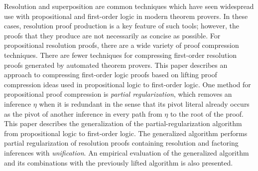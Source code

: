 Resolution and superposition are common techniques which have seen widespread use with propositional and first-order logic in modern theorem provers. In these cases, resolution proof production is a key feature of such tools; however, the proofs that they produce are not necessarily as concise as possible.
For propositional resolution proofs, there are a wide variety of proof compression techniques. There are fewer techniques for compressing first-order resolution proofs generated by automated theorem provers.
This paper describes an approach to compressing first-order logic proofs based on lifting proof compression ideas used in propositional logic to first-order logic. One method for propositional proof compression is \emph{partial regularization}, which removes an inference $\eta$ when it is redundant in the sense that its pivot literal already occurs as the pivot of another inference in every path from $\eta$ to the root of the proof. 
This paper describes the generalization of the partial-regularization algorithm
\RecyclePivotsIntersection \cite{LURPI}
from propositional logic to first-order logic. The generalized algorithm performs partial regularization of resolution proofs containing resolution and factoring inferences with \emph{unification}. %
An empirical evaluation of the generalized algorithm and its combinations with the previously lifted \SFOLowerUnits algorithm
\cite{GFOLU} is also presented.




